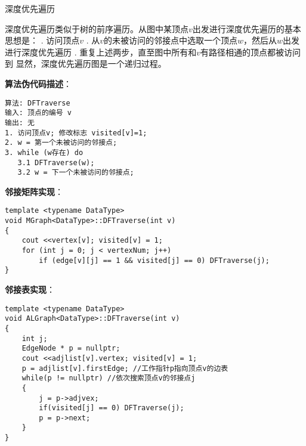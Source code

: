 \documentclass[12pt,a4paper]{amsart}
\begin{document}
\begin{algorithm}[H]
\caption{深度优先遍历}
\begin{algorithmic}[1]
\STATE 深度优先遍历类似于树的前序遍历。从图中某顶点$v$出发进行深度优先遍历的基本思想是：
. 访问顶点$v$
. 从$v$的未被访问的邻接点中选取一个顶点$w$，然后从$w$出发进行深度优先遍历
. 重复上述两步，直至图中所有和$v$有路径相通的顶点都被访问到
\STATE 显然，深度优先遍历图是一个递归过程。
\end{algorithmic}
\end{algorithm}

\textbf{算法伪代码描述}：
\begin{verbatim}
算法: DFTraverse
输入: 顶点的编号 v
输出: 无
1. 访问顶点v; 修改标志 visited[v]=1;
2. w = 第一个未被访问的邻接点;
3. while (w存在) do
   3.1 DFTraverse(w);
   3.2 w = 下一个未被访问的邻接点;
\end{verbatim}

\begin{center}
\end{center}

\textbf{邻接矩阵实现}：
\begin{lstlisting}[caption=邻接矩阵的深度优先遍历]
template <typename DataType>
void MGraph<DataType>::DFTraverse(int v)
{
    cout <<vertex[v]; visited[v] = 1;
    for (int j = 0; j < vertexNum; j++)
        if (edge[v][j] == 1 && visited[j] == 0) DFTraverse(j);
}
\end{lstlisting}

\textbf{邻接表实现}：
\begin{lstlisting}[caption=邻接表的深度优先遍历]
template <typename DataType>
void ALGraph<DataType>::DFTraverse(int v)
{
    int j;
    EdgeNode * p = nullptr;
    cout <<adjlist[v].vertex; visited[v] = 1;
    p = adjlist[v].firstEdge; //工作指针p指向顶点v的边表
    while(p != nullptr) //依次搜索顶点v的邻接点j
    {
        j = p->adjvex;
        if(visited[j] == 0) DFTraverse(j);
        p = p->next;
    }
}
\end{lstlisting}
\end{document}
